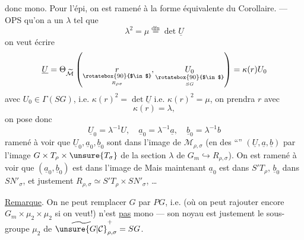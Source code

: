 donc mono. Pour l'épi, on est ramené à la forme équivalente du Corollaire. --- OPS qu'on a un $\lambda$ tel que
\[
\lambda^2=\mu\overset{\mathrm{dfn}}{=}\det\underline U
\]
on veut écrire
\[
\underline U=\Theta_{\widetilde{\mathcal M}}
\left(\underset{\underset{R_{\rho\sigma}}{\rotatebox{90}{$\in$}}}{r},
\underset{\underset{SG}{\rotatebox{90}{$\in$}}}{U_0}\right)
=\kappa(r)U_0
\]
avec $U_0\in\Gamma(SG)$, i.e. $\kappa(r)^2=\det\underline U$ i.e. $\kappa(r)^2=\mu$,
on prendra $r$ avec \deleted{$\unsure{\kappa}$}
\[
\kappa(r)=\lambda,
\]
 on pose donc
\[
\underline U_0=\lambda^{-1}U,\quad
\underline a_0=\lambda^{-1}\underline a,\quad
\underline b_0=\lambda^{-1}b
\]
  ramené à voir que $\underline U_0,\underline a_0,\underline b_0$ sont dans l'image de $\mathcal M_{\rho,\sigma}$ (en  des ``'' $(\underline U,\underline a,\underline b)$ par l'image  $G\times T_\rho\times\unsure{T_\sigma}$ de la section $\lambda$ de $G_m\hookrightarrow R_{\rho,\sigma}$). On est ramené à voir que $(\underline a_0,\underline b_0)$ est dans l'image de
Mais maintenant $\underline a_0$ est dans $S'T_\rho$, $\underline b_0$ dans $SN'_\sigma$, et justement $R_{\rho,\sigma}\simeq S'T_\rho\times SN'_\sigma$, \ldots

\uline{Remarque}. On ne peut remplacer $G$ par $PG$,
i.e.
(où on peut rajouter encore $G_m\times\mu_2\times\mu_2$ si on veut!) n'est \uline{pas} mono --- son noyau est justement le sous-groupe $\mu_2$ de $\widetilde{\unsure{G|\mathcal C}}_{\rho,\sigma}^{+}=SG$.



